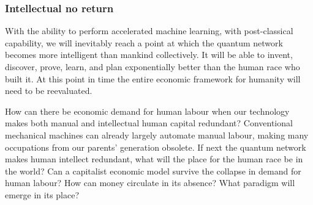 %
%

\subsubsection{Intellectual no return}

With the ability to perform accelerated machine learning, with post-classical capability, we will inevitably reach a point at which the quantum network becomes more intelligent than mankind collectively. It will be able to invent, discover, prove, learn, and plan exponentially better than the human race who built it. At this point in time the entire economic framework for humanity will need to be reevaluated.

How can there be economic demand for human labour when our technology makes both manual and intellectual human capital redundant? Conventional mechanical machines can already largely automate manual labour, making many occupations from our parents' generation obsolete. If next the quantum network makes human intellect redundant, what will the place for the human race be in the world? Can a capitalist economic model survive the collapse in demand for human labour? How can money circulate in its absence? What paradigm will emerge in its place?


